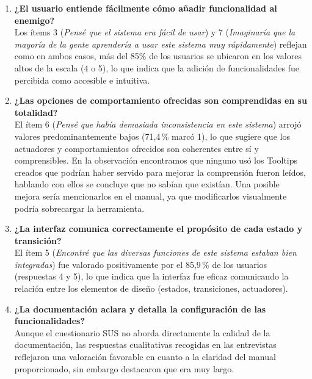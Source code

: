 \begin{enumerate}
    \item \textbf{¿El usuario entiende fácilmente cómo añadir funcionalidad al enemigo?} \\

Los ítems 3 (\textit{Pensé que el sistema era fácil de usar}) y 7 (\textit{Imaginaría que la mayoría de la gente aprendería a usar este sistema muy rápidamente}) reflejan como en ambos casos, más del 85\% de los usuarios se ubicaron en los valores altos de la escala (4 o 5), lo que indica que la adición de funcionalidades fue percibida como accesible e intuitiva. 

    \item \textbf{¿Las opciones de comportamiento ofrecidas son comprendidas en su totalidad?} \\

El ítem 6 (\textit{Pensé que había demasiada inconsistencia en este sistema}) arrojó valores predominantemente bajos (71,4\,\% marcó 1), lo que sugiere que los actuadores y comportamientos ofrecidos son coherentes entre sí y comprensibles. En la observación encontramos que ninguno usó los Tooltips creados que podrían haber servido para mejorar la comprensión fueron leídos, hablando con ellos se concluye que no sabían  que existían. Una posible mejora sería mencionarlos en el manual, ya que modificarlos visualmente podría sobrecargar la herramienta.

    \item \textbf{¿La interfaz comunica correctamente el propósito de cada estado y transición?} \\

El ítem 5 (\textit{Encontré que las diversas funciones de este sistema estaban bien integradas}) fue valorado positivamente por el 85,9\,\% de los usuarios (respuestas 4 y 5), lo que indica que la interfaz fue eficaz comunicando la relación entre los elementos de diseño (estados, transiciones, actuadores).

    \item \textbf{¿La documentación aclara y detalla la configuración de las funcionalidades?} \\

Aunque el cuestionario SUS no aborda directamente la calidad de la documentación, las respuestas cualitativas recogidas en las entrevistas reflejaron una valoración favorable en cuanto a la claridad del manual proporcionado, sin embargo destacaron que era muy largo. 
\end{enumerate}

